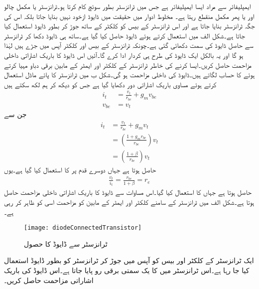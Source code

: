  ایمپلیفائر سے مراد ایسا ایمپلیفائر ہے  جس میں ٹرانزسٹر بطور سوئچ کام کرتا ہو۔ٹرانزسٹر یا مکمل چالو اور یا پھر مکمل منقطع رہتا ہے۔
مخلوط ادوار میں حقیقت میں ڈایوڈ ازخود نہیں بنایا جاتا بلکہ اس کی جگہ ٹرانزسٹر بنایا جاتا ہے اور اس ٹرانزسٹر کے بیس کو کلکٹر  کے ساتھ جوڑ کر بطور ڈایوڈ استعمال کیا جاتا ہے۔شکل  الف  میں  استعمال کرتے ہوئے  ڈایوڈ حاصل کیا گیا ہے۔ساتھ ہی ڈایوڈ دکھا کر ٹرانزسٹر سے حاصل ڈایوڈ کی سمت دکھائی گئی ہے۔چونکہ ٹرانزسٹر کے بیس اور کلکٹر  آپس میں جڑے ہیں لہٰذا  ہو گا اور یہ بالکل ایک ڈایوڈ کی طرح ہی کردار ادا کرے گا۔آئیں اس ڈایوڈ کا باریک اشاراتی داخلی مزاحمت حاصل کریں۔ایسا کرنے کی خاطر ٹرانزسٹر کے کلکٹر  اور ایمٹر کے مابین  برقی دباو مہیا کرتے ہوئے  کا حساب لگاتے ہیں۔ڈایوڈ کی داخلی مزاحمت  ہو گی۔شکل  ب میں ٹرانزسٹر کا پائے ماڈل استعمال کرتے ہوئے مساوی باریک اشاراتی دور دکھایا گیا ہے جس کو دیکھ کر ہم لکھ سکتے ہیں
\begin{align*}
i_t&=\frac{v_t}{r_{be}}+g_m v_{be}\\
v_{be}&=v_t
\end{align*}
جن سے
\begin{align*}
i_t&=\frac{v_t}{r_{be}}+g_m v_{t}\\
&=\left(\frac{1+g_m r_{be}}{r_{be}}\right) v_t\\
&=\left(\frac{1+\beta}{r_{be}}\right) v_t
\end{align*}
حاصل ہوتا ہے جہاں دوسرے قدم پر  کا استعمال کیا گیا ہے۔یوں
\begin{align}\label{مساوات_ٹرانزسٹر_ڈایوڈ_جڑے_ٹرانزسٹر_کی_مزاحمت}
\frac{v_t}{i_t}=\frac{r_{be}}{1+\beta}=r_e
\end{align}
حاصل ہوتا ہے جہاں  کا استعمال کیا گیا۔اس مساوات سے ڈایوڈ کا باریک اشاراتی داخلی مزاحمت  حاصل ہوتا ہے۔شکل  الف میں ٹرانزسٹر کے سامنے  کلکٹر  اور ایمٹر کے مابین کو  مزاحمت اسی کو ظاہر کر رہی ہے۔
%
\begin{figure}
\centering
\texttt{[image: diodeConnectedTransistor]}
\caption{ٹرانزسٹر سے ڈایوڈ کا حصول}
\label{شکل_ٹرانزسٹر_سے_ڈایوڈ_کا_حصول}
\end{figure}
ایک ٹرانزسٹر کے کلکٹر  اور بیس کو آپس میں جوڑ کر ٹرانزسٹر کو بطور ڈایوڈ استعمال کیا جا رہا ہے۔اس ٹرانزسٹر میں  کا یک سمتی برقی رو پایا جاتا ہے۔اس ڈایوڈ کی باریک اشاراتی مزاحمت حاصل کریں۔

